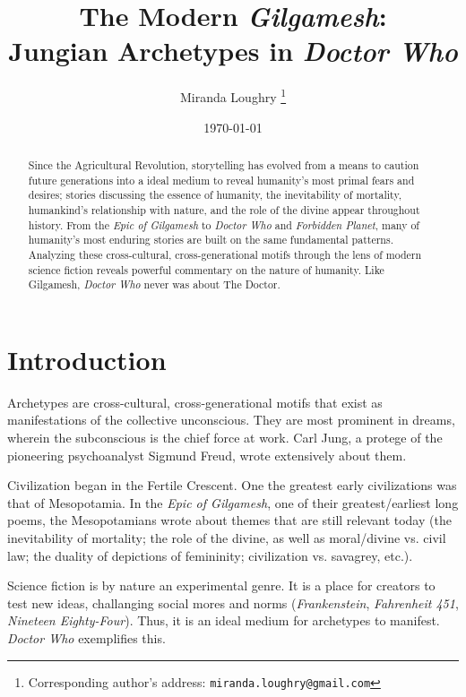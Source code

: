 \documentclass[10pt,a4paper]{article}
\begin{document}
\title{The Modern \emph{Gilgamesh}: \\
Jungian Archetypes in \emph{Doctor Who}}

\author{Miranda Loughry%
\thanks{Corresponding author's address: \texttt{miranda.loughry@gmail.com}}}

\date{\today}

\maketitle

\begin{abstract}
Since the Agricultural Revolution, storytelling has evolved from a means to
caution future generations into a ideal medium to reveal humanity's most
primal fears and desires; stories discussing the essence of humanity, the
inevitability of mortality, humankind's relationship with nature, and the
role of the divine appear throughout history. From the \emph{Epic of
Gilgamesh} to \emph{Doctor Who} and \emph{Forbidden Planet}, many of
humanity's most enduring stories are built on the same fundamental
patterns. Analyzing these cross-cultural, cross-generational motifs through
the lens of modern science fiction reveals powerful commentary on the
nature of humanity. Like Gilgamesh, \emph{Doctor Who} never was about The
Doctor.
\end{abstract}

\section{Introduction}
    Archetypes are cross-cultural, cross-generational motifs that exist as manifestations of the collective unconscious. They are most prominent in dreams, wherein the subconscious is the chief force at work. Carl Jung, a protege of the pioneering psychoanalyst Sigmund Freud, wrote extensively about them.
   
   Civilization began in the Fertile Crescent. One the greatest early civilizations was that of Mesopotamia. In the \emph{Epic of Gilgamesh}, one of their greatest/earliest long poems, the Mesopotamians wrote about themes that are still relevant today (the inevitability of mortality; the role of the divine, as well as moral/divine vs. civil law; the duality of depictions of femininity; civilization vs. savagrey, etc.). 
   
   Science fiction is by nature an experimental genre. It is a place for creators to test new ideas, challanging social mores and norms (\emph{Frankenstein}, \emph{Fahrenheit 451}, \emph{Nineteen Eighty-Four}). Thus, it is an ideal medium for archetypes to manifest. \emph{Doctor Who} exemplifies this.
\end{document}

